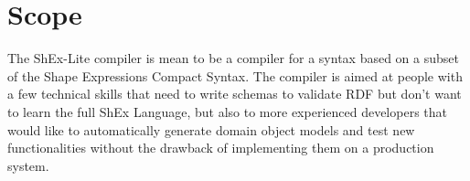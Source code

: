 \section{Scope}

The ShEx-Lite compiler is mean to be a compiler for a syntax based on a subset of the
Shape Expressions Compact Syntax. The compiler is aimed at people with a few technical
skills that need to write schemas to validate RDF but don’t want to learn the full ShEx
Language, but also to more experienced developers that would like to automatically
generate domain object models and test new functionalities without the drawback of
implementing them on a production system.